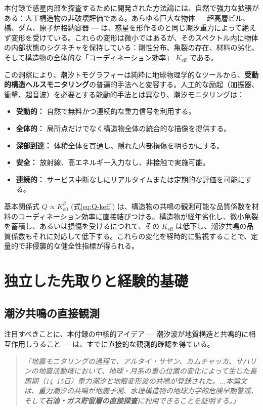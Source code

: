 \documentclass[12pt,a4paper]{article}
\theoremstyle{remark}
\begin{document}
	本付録で惑星内部を探査するために開発された方法論には、自然で強力な拡張がある：人工構造物の非破壊評価である。あらゆる巨大な物体 — 超高層ビル、橋、ダム、原子炉格納容器 — は、惑星を形作るのと同じ潮汐重力によって絶えず変形を受けている。これらの変形は微小ではあるが、そのスペクトル内に物体の内部状態のシグネチャを保持している：剛性分布、亀裂の存在、材料の劣化、そして構造物の全体的な「コーディネーション効率」 \(K_{\mathrm{eff}}\) である。
	
	この洞察により、潮汐トモグラフィーは純粋に地球物理学的なツールから、\textbf{受動的構造ヘルスモニタリング}の普遍的手法へと変容する。人工的な励起（加振器、衝撃、超音波）を必要とする能動的手法とは異なり、潮汐モニタリングは：
	\begin{itemize}
		\item \textbf{受動的：} 自然で無料かつ連続的な重力信号を利用する。
		\item \textbf{全体的：} 局所点だけでなく構造物全体の統合的な描像を提供する。
		\item \textbf{深部到達：} 体積全体を貫通し、隠れた内部損傷を明らかにする。
		\item \textbf{安全：} 放射線、高エネルギー入力なし、非接触で実施可能。
		\item \textbf{連続的：} サービス中断なしにリアルタイムまたは定期的な評価を可能にする。
	\end{itemize}
	
	基本関係式 \(Q \propto K_{\mathrm{eff}}^{\beta}\) (式\ref{eq:Q-keff}) は、構造物の共鳴の観測可能な品質係数を材料のコーディネーション効率に直接結びつける。構造物が経年劣化し、微小亀裂を蓄積し、あるいは損傷を受けるにつれて、その \(K_{\mathrm{eff}}\) は低下し、潮汐共鳴の品質係数もそれに対応して低下する。これらの変化を経時的に監視することで、定量的で非侵襲的な健全性指標が得られる。
	
	\section{独立した先取りと経験的基礎}
	\label{sec:prior}
	
	\subsection{潮汐共鳴の直接観測}
	
	注目すべきことに、本付録の中核的アイデア — 潮汐波が地質構造と共鳴的に相互作用しうること — は、すでに直接的な観測的確認を得ている。
	
	\begin{quotation}
		\noindent
		\textit{「地震モニタリングの過程で、アルタイ・サヤン、カムチャッカ、サハリンの地震活動域において、地球・月系の重心位置の変化によって生じた長周期（14–15日）重力潮汐と地殻変形波の共鳴が登録された。...本論文は、重力潮汐の共鳴が地震予測、水理構造物の地球力学的危険早期警戒、そして\textbf{石油・ガス貯留層の直接探査}に利用できることを証明する。」} \cite{Sibgatulin2014}
	\end{quotation}
	
\end{document}
